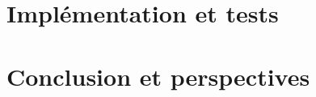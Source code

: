 \documentclass[a4paper,10pt]{report}
\begin{document}
%
%
%
%
%
%

\chapter{Implémentation et tests}


\chapter{Conclusion et perspectives}
\end{document}

